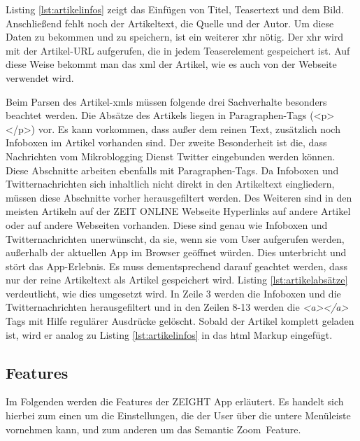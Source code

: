 \documentclass[12pt,a4paper,bibtotoc,abstracton]{scrartcl}
\begin{document}
Listing \ref{lst:artikelinfos} zeigt das Einfügen von Titel, Teasertext und  dem Bild. Anschließend fehlt noch der Artikeltext, die Quelle und der Autor. Um diese Daten zu bekommen und zu speichern, ist ein weiterer \ac{xhr} nötig. Der \ac{xhr} wird mit der Artikel-URL aufgerufen, die in jedem Teaserelement gespeichert ist. Auf diese Weise bekommt man das \ac{xml} der Artikel, wie es auch von der Webseite verwendet wird. 

\begin{minipage}{\linewidth}
  
\end{minipage}

Beim Parsen des Artikel-\ac{xml}s müssen folgende drei Sachverhalte besonders beachtet werden. Die Absätze des Artikels liegen in Paragraphen-Tags (<p></p>) vor. Es kann vorkommen, dass außer dem reinen Text, zusätzlich noch Infoboxen im Artikel vorhanden sind. Der zweite Besonderheit ist die, dass Nachrichten vom Mikroblogging Dienst Twitter eingebunden werden können. Diese Abschnitte arbeiten ebenfalls mit Paragraphen-Tags. Da Infoboxen und Twitternachrichten sich inhaltlich nicht direkt in den Artikeltext eingliedern, müssen diese Abschnitte vorher herausgefiltert werden. Des Weiteren sind in den meisten Artikeln auf der ZEIT ONLINE Webseite Hyperlinks auf andere Artikel oder auf andere Webseiten vorhanden. Diese sind genau wie Infoboxen und Twitternachrichten unerwünscht, da sie, wenn sie vom User aufgerufen werden, außerhalb der aktuellen App im Browser geöffnet würden. Dies unterbricht und stört das App-Erlebnis. Es muss dementsprechend darauf geachtet werden, dass nur der reine Artikeltext als Artikel gespeichert wird. Listing \ref{lst:artikelabsätze} verdeutlicht, wie dies umgesetzt wird. In Zeile 3 werden die Infoboxen und die Twitternachrichten herausgefiltert und in den Zeilen 8-13 werden die \textit{<a></a>} Tags mit Hilfe regulärer Ausdrücke gelöscht. Sobald der Artikel komplett geladen ist, wird er analog zu Listing \ref{lst:artikelinfos} in das \ac{html} Markup eingefügt.

\begin{minipage}{\linewidth}
  
\end{minipage}

\subsection{Features}
\label{subsec:features}
Im Folgenden werden die Features der ZEIGHT App erläutert. Es handelt sich hierbei zum einen um die Einstellungen, die der User über die untere Menüleiste vornehmen kann, und zum anderen um das \glqq Semantic Zoom\grqq\ Feature.
\end{document}
